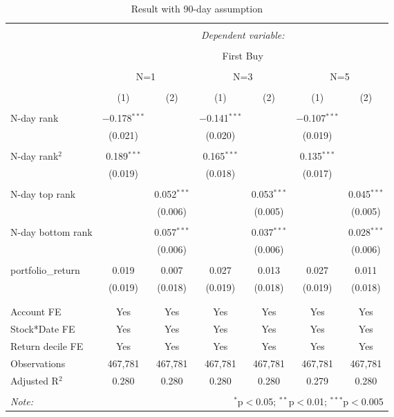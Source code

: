 
\begin{table}[!htbp] \centering 
  \caption{Result with 90-day assumption} 
  \label{} 
\begin{tabular}{@{\extracolsep{5pt}}lcccccc} 
\\[-1.8ex]\hline 
\hline \\[-1.8ex] 
 & \multicolumn{6}{c}{\textit{Dependent variable:}} \\ 
\cline{2-7} 
\\[-1.8ex] & \multicolumn{6}{c}{First Buy} \\ 
\\[-1.8ex] & \multicolumn{2}{c}{N=1}& \multicolumn{2}{c}{N=3}& \multicolumn{2}{c}{N=5} \\
\cmidrule(lr){2-3}
\cmidrule(lr){4-5}
\cmidrule(lr){6-7}
\\[-1.8ex] & (1) & (2) & (1) & (2) & (1) & (2)\\ 
\hline \\[-1.8ex]
  N-day rank & $-$0.178$^{***}$ &  & $-$0.141$^{***}$ &  & $-$0.107$^{***}$ &  \\ 
  & (0.021) &  & (0.020) &  & (0.019) &  \\ 
  & & & & & & \\  
  N-day rank$^2$  & 0.189$^{***}$ &  & 0.165$^{***}$ &  & 0.135$^{***}$ &  \\ 
  & (0.019) &  & (0.018) &  & (0.017) &  \\ 
  & & & & & & \\ 
  N-day top rank &  & 0.052$^{***}$ &  & 0.053$^{***}$ &  & 0.045$^{***}$ \\ 
  &  & (0.006) &  & (0.005) &  & (0.005) \\ 
  & & & & & & \\ 
  N-day bottom rank &  & 0.057$^{***}$ &  & 0.037$^{***}$ &  & 0.028$^{***}$ \\ 
  &  & (0.006) &  & (0.006) &  & (0.006) \\ 
  & & & & & & \\ 
 portfolio\_return & 0.019 & 0.007 & 0.027 & 0.013 & 0.027 & 0.011 \\ 
  & (0.019) & (0.018) & (0.019) & (0.018) & (0.019) & (0.018) \\ 
  & & & & & & \\ 
\hline \\[-1.8ex] 
Account FE & Yes & Yes & Yes & Yes & Yes & Yes \\ 
Stock*Date FE & Yes & Yes & Yes & Yes & Yes & Yes \\ 
Return decile FE & Yes & Yes & Yes & Yes & Yes & Yes \\ 
Observations & 467,781 & 467,781 & 467,781 & 467,781 & 467,781 & 467,781 \\ 
Adjusted R$^{2}$ & 0.280 & 0.280 & 0.280 & 0.280 & 0.279 &  0.280 \\ 
\hline 
\hline \\[-1.8ex] 
\textit{Note:}  & \multicolumn{6}{r}{$^{*}$p$<$0.05; $^{**}$p$<$0.01; $^{***}$p$<$0.005} \\ 
\end{tabular} 
\end{table} 
